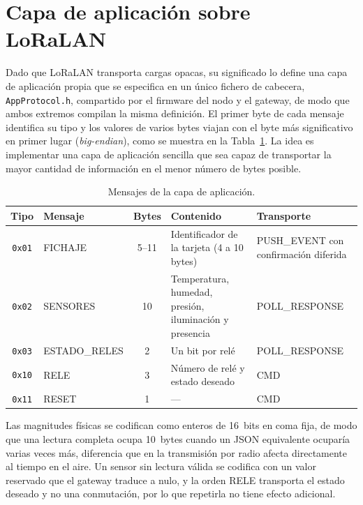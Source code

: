 \section{Capa de aplicación sobre LoRaLAN}\label{sec:appprotocol}

Dado que LoRaLAN transporta cargas opacas, su significado lo define una capa de aplicación propia que se especifica en un único fichero de cabecera, \texttt{AppProtocol.h}, compartido por el firmware del nodo y el gateway, de modo que ambos extremos compilan la misma definición. El primer byte de cada mensaje identifica su tipo y los valores de varios bytes viajan con el byte más significativo en primer lugar (\textit{big-endian}), como se muestra en la Tabla~\ref{tab:appmsg}. La idea es implementar una capa de aplicación sencilla que sea capaz de transportar la mayor cantidad de información en el menor número de bytes posible.

\begin{table}[H]
\centering
\small
\caption{\label{tab:appmsg} Mensajes de la capa de aplicación.}
\begin{tabular}{|c|l|c|p{4.6cm}|p{3cm}|}
\hline
\textbf{Tipo} & \textbf{Mensaje} & \textbf{Bytes} & \textbf{Contenido} & \textbf{Transporte} \\
\hline
\texttt{0x01} & FICHAJE & 5--11 & Identificador de la tarjeta (4 a 10 bytes) & PUSH\_EVENT con confirmación diferida \\
\hline
\texttt{0x02} & SENSORES & 10 & Temperatura, humedad, presión, iluminación y presencia & POLL\_RESPONSE \\
\hline
\texttt{0x03} & ESTADO\_RELES & 2 & Un bit por relé & POLL\_RESPONSE \\
\hline
\texttt{0x10} & RELE & 3 & Número de relé y estado deseado & CMD \\
\hline
\texttt{0x11} & RESET & 1 & --- & CMD \\
\hline
\end{tabular}
\end{table}

Las magnitudes físicas se codifican como enteros de 16~bits en coma fija, de modo que una lectura completa ocupa 10~bytes cuando un JSON equivalente ocuparía varias veces más, diferencia que en la transmisión por radio afecta directamente al tiempo en el aire. Un sensor sin lectura válida se codifica con un valor reservado que el gateway traduce a nulo, y la orden RELE transporta el estado deseado y no una conmutación, por lo que repetirla no tiene efecto adicional.

